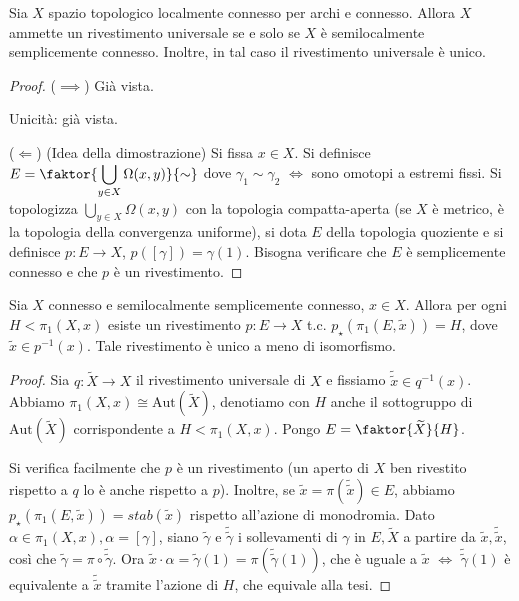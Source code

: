 \begin{thm}
  Sia $X$ spazio topologico localmente connesso per archi e connesso. Allora $X$ ammette un rivestimento universale se e solo se $X$ è semilocalmente semplicemente connesso. Inoltre, in tal caso il rivestimento universale è unico.
\end{thm}

\begin{proof}
  ($\implies$) Già vista.

  Unicità: già vista.

  ($\Leftarrow$) (Idea della dimostrazione) Si fissa $x \in X$. Si definisce $\displaystyle E= \faktor{\bigcup_{y \in X}\Omega(x, y)}{\sim}$ dove $\gamma_1 \sim \gamma_2$ $\iff$ sono omotopi a estremi fissi.
  Si topologizza $\displaystyle \bigcup_{y \in X} \Omega(x, y)$ con la topologia compatta-aperta (se $X$ è metrico, è la topologia della convergenza uniforme), si dota $E$ della topologia quoziente e si definisce $p:E \rightarrow X$, $p([\gamma])=\gamma(1)$. Bisogna verificare che $E$ è semplicemente connesso e che $p$ è un rivestimento.
\end{proof}

\begin{thm}
  Sia $X$ connesso e semilocalmente semplicemente connesso, $x \in X$. Allora per ogni $H<\pi_1(X, x)$ esiste un rivestimento $p:E \rightarrow X$ t.c. $p_{\star}(\pi_1(E, \tilde{x}))=H$, dove $\tilde{x} \in p^{-1}(x)$. Tale rivestimento è unico a meno di isomorfismo.
\end{thm}

\begin{proof}
  Sia $q:\widetilde{X} \rightarrow X$ il rivestimento universale di $X$ e fissiamo $\tilde{\tilde{x}} \in q^{-1}(x)$. Abbiamo $\pi_1(X, x) \cong \text{Aut}(\widetilde{X})$, denotiamo con $H$ anche il sottogruppo di $\text{Aut}(\widetilde{X})$ corrispondente a $H<\pi_1(X, x)$. Pongo $E=\faktor{\widetilde{X}}{H}$.
  \begin{center}
  \end{center}
  Si verifica facilmente che $p$ è un rivestimento (un aperto di $X$ ben rivestito rispetto a $q$ lo è anche rispetto a $p$). Inoltre, se $\tilde{x}=\pi(\tilde{\tilde{x}}) \in E$, abbiamo $p_{\star}(\pi_1(E, \tilde{x}))=stab(\tilde{x})$ rispetto all'azione di monodromia.
  Dato $\alpha \in \pi_1(X, x), \alpha=[\gamma]$, siano $\tilde{\gamma}$ e $\tilde{\tilde{\gamma}}$ i sollevamenti di $\gamma$ in $E, \widetilde{X}$ a partire da $\tilde{x}, \tilde{\tilde{x}}$, così che $\tilde{\gamma}=\pi \circ \tilde{\tilde{\gamma}}$.
  Ora $\tilde{x}\cdot\alpha=\tilde{\gamma}(1)=\pi(\tilde{\tilde{\gamma}}(1))$, che è uguale a $\tilde{x}$ $\iff$ $\tilde{\tilde{\gamma}}(1)$ è equivalente a $\tilde{\tilde{x}}$ tramite l'azione di $H$, che equivale alla tesi.
\end{proof}

